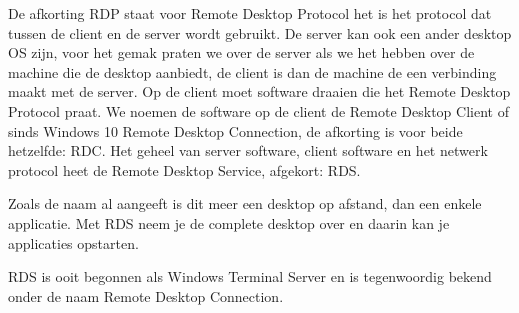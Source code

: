 De afkorting RDP staat voor Remote Desktop Protocol het is het protocol dat tussen de client en de server wordt gebruikt. De server kan ook een ander desktop OS zijn, voor het gemak praten we over de server als we het hebben over de machine die de desktop aanbiedt, de client is dan de machine de een verbinding maakt met de server. Op de client moet software draaien die het Remote Desktop Protocol praat. We noemen de software op de client de Remote Desktop Client of sinds Windows 10 Remote Desktop Connection, de afkorting is voor beide hetzelfde: RDC. Het geheel van server software, client software en het netwerk protocol heet de Remote Desktop Service, afgekort: RDS.

Zoals de naam al aangeeft is dit meer een desktop op afstand, dan een enkele applicatie. Met RDS neem je de complete desktop over en daarin kan je applicaties opstarten.

RDS is ooit begonnen als Windows Terminal Server en is tegenwoordig bekend onder de naam Remote Desktop Connection.

